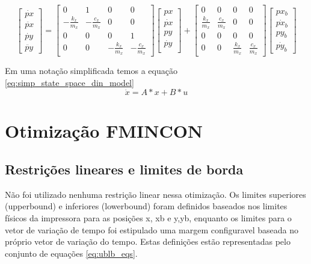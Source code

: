 \begin{equation}
    \label{eq:espaco_de_estados_din_model}
    \begin{bmatrix}
        \dot{px} \\
        \ddot{px} \\
        \dot{py} \\
        \ddot{py}
    \end{bmatrix}
    =
    \begin{bmatrix}
        0 & 1 & 0 & 0 \\
        -\frac{k_x}{m_x} & -\frac{c_x}{m_x} & 0 & 0 \\
        0 & 0 & 0 & 1 \\
        0 & 0 & -\frac{k_x}{m_x} & -\frac{c_x}{m_x}
    \end{bmatrix}
    \begin{bmatrix}
        px \\
        \dot{px} \\        
        py \\
        \dot{py} \\
    \end{bmatrix}
    +
    \begin{bmatrix}
        0 & 0 & 0 & 0 \\
        \frac{k_x}{m_x} & \frac{c_x}{m_x} & 0 & 0 \\
        0 & 0 & 0 & 0 \\
        0 & 0 & \frac{k_x}{m_x} & \frac{c_x}{m_x}
    \end{bmatrix}
    \begin{bmatrix}
        px_b \\
        \dot{px_b}  \\
        py_b \\
        \dot{py_b} 
    \end{bmatrix}
\end{equation}

Em uma notação simplificada temos a equação \ref{eq:simp_state_space_din_model}
\begin{equation}
    \label{eq:simp_state_space_din_model}
    \dot x = A*x+B*u
\end{equation}

\section{Otimização FMINCON}
\subsection{Restrições lineares e limites de borda}
Não foi utilizado nenhuma restrição linear nessa otimização.
Os limites superiores (upperbound) e inferiores (lowerbound) foram definidos
baseados nos limites físicos da impressora para as posições x, xb e y,yb, 
enquanto os limites para o vetor de variação de tempo foi estipulado uma margem
configuravel baseada no próprio vetor de variação do tempo.
Estas definições estão representadas pelo conjunto de equações \ref{eq:ublb_eqs}.

